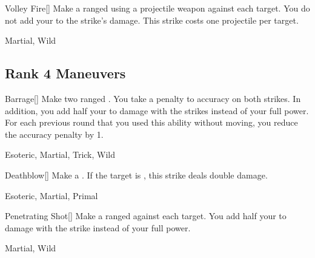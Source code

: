 \lowercase{\hypertarget{maneuver:Volley Fire}{}}\label{maneuver:Volley Fire}
\hypertarget{maneuver:Volley Fire}{}
\begin{freeability}[Rank 3]{Volley Fire}[]
Make a ranged  using a projectile weapon against each target.
You do not add your  to the strike's damage.
This strike costs one projectile per target.


 Martial, Wild
\end{freeability}
\vspace{0.25em}


\subsection{Rank 4 Maneuvers}

\lowercase{\hypertarget{maneuver:Barrage}{}}\label{maneuver:Barrage}
\hypertarget{maneuver:Barrage}{}
\begin{freeability}[Rank 4]{Barrage}[]
Make two ranged .
You take a  penalty to accuracy on both strikes.
In addition, you add half your  to damage with the strikes instead of your full power.
For each previous round that you used this ability without moving, you reduce the accuracy penalty by 1.


 Esoteric, Martial, Trick, Wild
\end{freeability}
\vspace{0.25em}



\lowercase{\hypertarget{maneuver:Deathblow}{}}\label{maneuver:Deathblow}
\hypertarget{maneuver:Deathblow}{}
\begin{freeability}[Rank 4]{Deathblow}[]
Make a .
If the target is , this strike deals double damage.


 Esoteric, Martial, Primal
\end{freeability}
\vspace{0.25em}



\lowercase{\hypertarget{maneuver:Penetrating Shot}{}}\label{maneuver:Penetrating Shot}
\hypertarget{maneuver:Penetrating Shot}{}
\begin{freeability}[Rank 4]{Penetrating Shot}[]
Make a ranged  against each target.
You add half your  to damage with the strike instead of your full power.


 Martial, Wild
\end{freeability}
\vspace{0.25em}



